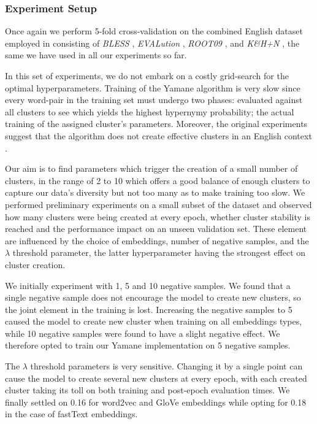 \subsubsection{Experiment Setup}
Once again we perform 5-fold cross-validation on the combined English dataset employed in \citep{ustalov2017negative} consisting of \textit{BLESS} \citep{Baroni2011}, \textit{EVALution} \citep{santus2015evalution}, \textit{ROOT09} \citep{santus2016nine}, and \textit{K\&H+N} \citep{necsulescu2015reading}, the same we have used in all our experiments so far.

In this set of experiments, we do not embark on a costly grid-search for the optimal hyperparameters.  Training of the Yamane algorithm is very slow since every word-pair in the training set must undergo two phases: evaluated against all clusters to see which yields the highest hypernymy probability; the actual training of the assigned cluster's parameters.  Moreover, the original experiments suggest that the algorithm does not create effective clusters in an English context \citep{yamane2016distributional}.  

Our aim is to find parameters which trigger the creation of a small number of clusters, in the range of 2 to 10 which offers a good balance of enough clusters to capture our data's diversity but not too many as to make training too slow.  We performed preliminary experiments on a small subset of the dataset and observed how many clusters were being created at every epoch, whether cluster stability is reached and the performance impact on an unseen validation set.  These element are influenced by the choice of embeddings, number of negative samples, and the $\lambda$ threshold parameter, the latter hyperparameter having the strongest effect on cluster creation.

We initially experiment with 1, 5 and 10 negative samples.  We found that a single negative sample does not encourage the model to create new clusters, so the joint element in the training is lost.  Increasing the negative samples to 5 caused the model to create new cluster when training on all embeddings types, while 10 negative samples were found to have a slight negative effect.  We therefore opted to train our Yamane implementation on 5 negative samples.

The $\lambda$ threshold parameters is very sensitive.  Changing it by a single point can cause the model to create several new clusters at every epoch, with each created cluster taking its toll on both training and post-epoch evaluation times.  We finally settled on 0.16 for word2vec and GloVe embeddings while opting for 0.18 in the case of fastText embeddings.


